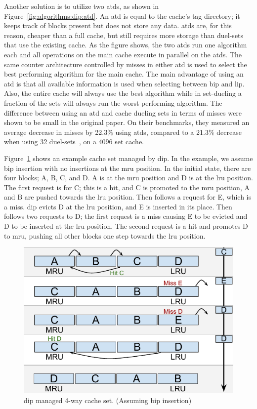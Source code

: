 Another solution is to utilize two \glspl{atd}, as shown in Figure~\ref{fig:algorithms:dip:atd}.
An \gls{atd} is equal to the cache's tag directory; it keeps track of blocks present but does not store any data.
\glspl{atd} are, for this reason, cheaper than a full cache, but still requires more storage than duel-sets that use the existing cache.
As the figure shows, the two \glspl{atd} run one algorithm each and all operations on the main cache execute in parallel on the \glspl{atd}.
The same counter architecture controlled by misses in either \gls{atd} is used to select the best performing algorithm for the main cache.
The main advantage of using an \gls{atd} is that all available information is used when selecting between \gls{bip} and \gls{lip}.
Also, the entire cache will always use the best algorithm while in set-dueling a fraction of the sets will always run the worst performing algorithm.
The difference between using an \gls{atd} and cache dueling sets in terms of misses were shown to be small in the original paper.
On their benchmarks, they measured an average decrease in misses by 22.3\% using \glspl{atd}, compared to a 21.3\% decrease when using 32 duel-sets~\cite{Qureshi2007}, on a 4096 set cache.

Figure~\ref{fig:algorithms:bip_example} shows an example cache set managed by \gls{dip}.
In the example, we assume \gls{bip} insertion with no insertions at the \gls{mru} position.
In the initial state, there are four blocks; A, B, C, and D.
A is at the \gls{mru} position and D is at the \gls{lru} position.
The first request is for C; this is a hit, and C is promoted to the \gls{mru} position, A and B are pushed towards the \gls{lru} position.
Then follows a request for E, which is a miss.
\gls{dip} evicts D at the \gls{lru} position, and E is inserted in its place.
Then follows two requests to D; the first request is a miss causing E to be evicted and D to be inserted at the \gls{lru} position.
The second request is a hit and promotes D to \gls{mru}, pushing all other blocks one step towards the \gls{lru} position.

\begin{figure}[ht]
    \centering
    \includegraphics[width=.65\textwidth]{figures/algorithms/DIP}
    \caption[DIP managed 4-way cache set.]{\gls{dip} managed 4-way cache set. (Assuming \gls{bip} insertion)}
    \label{fig:algorithms:bip_example}
\end{figure}
